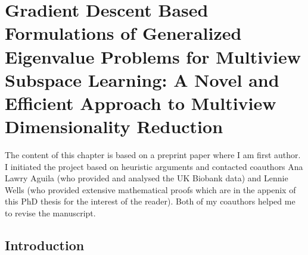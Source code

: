 \chapter{Gradient Descent Based Formulations of Generalized Eigenvalue Problems for Multiview Subspace Learning: A Novel and Efficient Approach to Multiview Dimensionality Reduction}\label{gradient descent}
The content of this chapter is based on a preprint paper where I am first author.
I initiated the project based on heuristic arguments and contacted coauthors Ana Lawry Aguila (who provided and analysed the UK Biobank data) and Lennie Wells (who provided extensive mathematical proofs which are in the appenix of this PhD thesis for the interest of the reader).
Both of my coauthors helped me to revise the manuscript.

\section{Introduction} %


